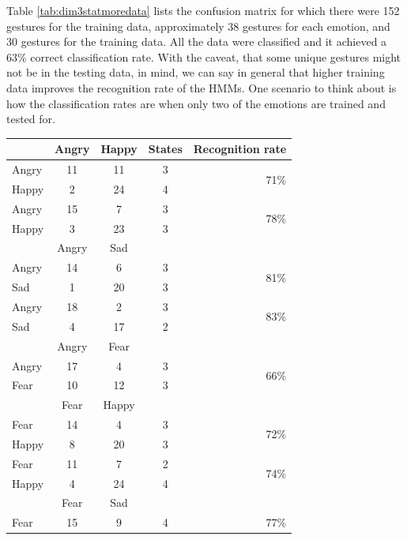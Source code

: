 \documentclass[]{report}   %
\begin{document}
Table \ref{tab:dim3statmoredata} lists the confusion matrix for which there were 152 gestures for the training data, approximately 38 gestures for each emotion, and 30 gestures for the training data. All the data were classified and it achieved a 63\% correct classification rate. With the caveat, that some unique gestures might not be in the testing data, in mind, we can say in general that higher training data improves the recognition rate of the HMMs. One scenario to think about is how the classification rates are when only two of the emotions are trained and tested for.
\begin{table}[htbp]
	\centering
		\begin{tabular}{|l|c|c||c|r|}
		\hline
             & Angry & Happy & States & Recognition rate \\ \hline
        Angry & 11     & 11    & 3   & \multirow{2}{*}{71\%} \\ 
        Happy  & 2    & 24   & 4   &  \\ \hline
		Angry & 15     & 7    & 3   & \multirow{2}{*}{78\%} \\ 
        Happy  & 3    & 23   & 3   &  \\ \hline
             & Angry & Sad & \multicolumn{2}{|c|}{}\\ \hline
        Angry & 14     & 6    & 3   & \multirow{2}{*}{81\%} \\ 
        Sad  & 1    & 20   & 3   &  \\ \hline
		Angry & 18     & 2    & 3   & \multirow{2}{*}{83\%} \\ 
        Sad  & 4    & 17   & 2   &  \\ \hline
             & Angry & Fear & \multicolumn{2}{|c|}{}\\ \hline
        Angry & 17     & 4    & 3   & \multirow{2}{*}{66\%} \\ 
        Fear  & 10    & 12   & 3   &  \\ \hline\hline
             & Fear & Happy & \multicolumn{2}{|c|}{}\\ \hline
        Fear & 14     & 4    & 3   & \multirow{2}{*}{72\%} \\ 
        Happy  & 8    & 20   & 3   &  \\ \hline
		Fear & 11     & 7    & 2   & \multirow{2}{*}{74\%} \\ 
        Happy  & 4    & 24   & 4   &  \\ \hline
             & Fear & Sad & \multicolumn{2}{|c|}{}\\ \hline
        Fear & 15     & 9    & 4   & \multirow{2}{*}{77\%} \\ 

\end{tabular}
\end{table}
\end{document}
